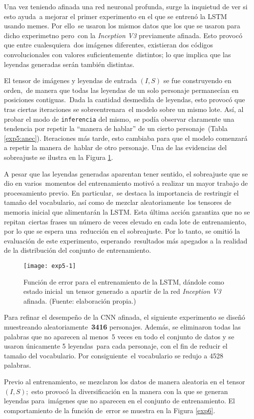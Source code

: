 Una vez teniendo afinada una red neuronal profunda, surge la inquietud de ver si esto ayuda\
a mejorar el primer experimento en el que se entrenó la LSTM usando memes. Por ello\
se usaron los mismos datos que los que se usaron para dicho experimetno pero\
con la \emph{Inception V3} previamente afinada. Esto provocó que entre cualesquiera\
dos imágenes diferentes, existieran dos códigos convolucionales con valores suficientemente\
distintos; lo que implica que las leyendas generadas serán también distintas.\par
El tensor de imágenes y leyendas de entrada $(I, S)$ se fue construyendo en orden,\
de manera que todas las leyendas de un solo personaje permanecían en posiciones contiguas.\
Dada la cantidad desmedida de leyendas, esto provocó que tras ciertas iteraciones se sobreentrenara\
el modelo sobre un mismo lote. Así, al probar el modo de \verb+inferencia+ del mismo,\
se podía observar claramente una tendencia por repetir la ``manera de hablar'' de un cierto personaje\
(Tabla \ref{exp5:anec}). Iteraciones más tarde, esto cambiaba para que el modelo comenzará a repetir la manera de\
hablar de otro personaje. Una de las evidencias del sobreajuste se ilustra en la Figura \ref{exp5}.\par
A pesar que las leyendas generadas aparentan tener sentido, el sobreajuste que se dio en varios\
momentos del entrenamiento motivó a realizar un mayor trabajo de procesamiento previo. En particular,\
se destaca la importancia de restringir el tamaño del vocabulario, así como de mezclar aleatoriamente\
los tensores de memoria inicial que alimentarán la LSTM. Esta última acción garantiza que no se repitan\
ciertas frases un número de veces elevado en cada lote de entrenamiento, por lo que se espera una\
reducción en el sobreajuste. Por lo tanto, se omitió la evaluación de este experimento, esperando\
resultados más apegados a la realidad de la distribución del conjunto de entrenamiento.

\begin{figure}[h]
  \texttt{[image: exp5-1]}
  \caption{
    Función de error para el entrenamiento de la LSTM, dándole como estado inicial\
    un tensor generado a apartir de la red \emph{Inception V3} afinada.
    (Fuente: elaboración propia.)
  }
  \label{exp5}
\end{figure}

Para refinar el desempeño de la CNN afinada, el siguiente experimento se diseñó muestreando aleatoriamente\
\textbf{3416} personajes. Además, se eliminaron todas las palabras que no aparecen al menos\
5 veces en todo el conjunto de datos y se usaron únicamente 5 leyendas\
para cada personaje, con el fin de reducir el tamaño del vocabulario. Por consiguiente\
el vocabulario se redujo a 4528 palabras.\par
Previo al entrenamiento, se mezclaron los datos de manera aleatoria en el tensor $(I, S)$;\
esto provocó la diversificación en la manera con la que se generan leyendas para\
imágenes que no aparecen en el conjunto de entrenamiento. El comportamiento de la función de\
error se muestra en la Figura \ref{exp6}.

